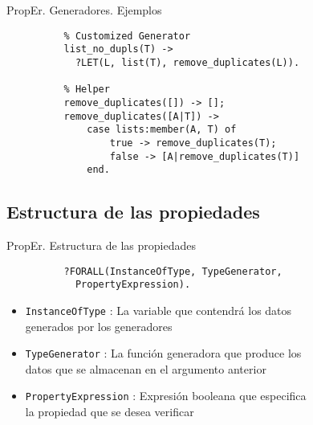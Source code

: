 \documentclass{beamer}
\begin{document}
      \begin{frame}[fragile]{PropEr. Generadores. Ejemplos}
        \begin{verbatim}
          % Customized Generator
          list_no_dupls(T) ->
            ?LET(L, list(T), remove_duplicates(L)).

          % Helper
          remove_duplicates([]) -> [];
          remove_duplicates([A|T]) ->
              case lists:member(A, T) of
                  true -> remove_duplicates(T);
                  false -> [A|remove_duplicates(T)]
              end.
        \end{verbatim}
      \end{frame}

    \subsection{Estructura de las propiedades}
      \begin{frame}[fragile]{PropEr. Estructura de las propiedades}
        \begin{verbatim}
          ?FORALL(InstanceOfType, TypeGenerator,
            PropertyExpression).
        \end{verbatim}
        \begin{itemize}
          \item \texttt{InstanceOfType} : La variable que contendrá los datos\\
          generados por los generadores
          \item \texttt{TypeGenerator} : La función generadora que produce los\\
          datos que se almacenan en el argumento anterior
          \item \texttt{PropertyExpression} : Expresión booleana que especifica\\
          la propiedad que se desea verificar
        \end{itemize}
      \end{frame}
\end{document}
